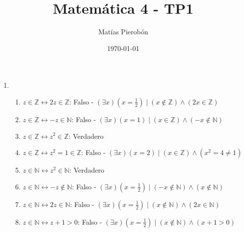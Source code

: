 \documentclass[11pt]{article}
\title{Matemática 4 - TP1}
\author{Matías Pierobón}
\date{\today}
\begin{document}
\maketitle

\begin{enumerate}
\item 
\begin{enumerate}
	\item $z \in \mathbb{Z} \leftrightarrow 2 z \in \mathbb{Z}$: Falso - $\left(\exists x\right) \left(x = \frac{1}{2}\right) \mid \left(x \not \in \mathbb{Z}\right) \land \left(2x \in \mathbb{Z}\right)$
	\item $z \in \mathbb{Z} \leftrightarrow -z \in \mathbb{N}$: Falso - $\left(\exists x\right) \left(x = 1\right) \mid \left(x \in \mathbb{Z}\right) \land \left(-x \notin \mathbb{N}\right)$
	\item $z \in \mathbb{Z} \leftrightarrow z^2 \in \mathbb{Z}$: Verdadero
	\item $z \in \mathbb{Z} \leftrightarrow z^2 = 1 \in \mathbb{Z}$: Falso - $\left(\exists x\right) \left(x = 2\right) \mid \left(x \in \mathbb{Z}\right) \land \left(x^2 = 4 \neq 1\right)$
	\item $z \in \mathbb{N} \leftrightarrow z^2 \in \mathbb{N}$: Verdadero
	\item $z \in \mathbb{N} \leftrightarrow -z \notin \mathbb{N}$: Falso - $\left(\exists x\right) \left(x = \frac{1}{2}\right) \mid \left(-x \not \in \mathbb{N}\right) \land \left(x \not \in \mathbb{N}\right)$
	\item $z \in \mathbb{N} \leftrightarrow 2z \in \mathbb{N}$: Falso - $\left(\exists x\right) \left(x = \frac{1}{2}\right) \mid \left(x \not \in \mathbb{N}\right) \land \left(2x \in \mathbb{N}\right)$
	\item $z \in \mathbb{N} \leftrightarrow z + 1 > 0$: Falso - $\left(\exists x\right) \left(x = \frac{1}{2}\right) \mid \left(x \not \in \mathbb{N}\right) \land \left(x + 1 > 0\right)$
\end{enumerate}


\end{enumerate}
\end{document}

